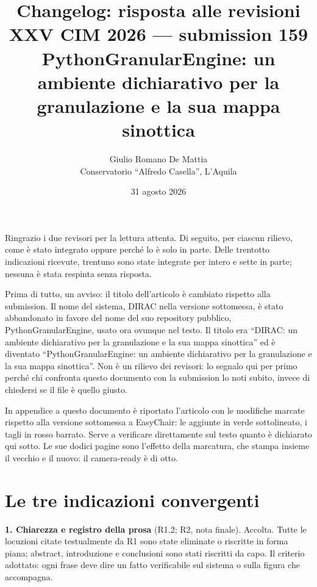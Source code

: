 \documentclass[11pt,a4paper]{article}
\title{\textbf{Changelog: risposta alle revisioni}\\[4pt]
\large XXV CIM 2026 --- submission 159\\
\normalsize PythonGranularEngine: un ambiente dichiarativo per la granulazione
e la sua mappa sinottica}
\author{Giulio Romano De Mattia\\ Conservatorio ``Alfredo Casella'', L'Aquila}
\date{31 agosto 2026}
\begin{document}
\maketitle

Ringrazio i due revisori per la lettura attenta. Di seguito, per ciascun
rilievo, come è stato integrato oppure perché lo è solo in parte. Delle
trentotto indicazioni ricevute, trentuno sono state integrate per intero e
sette in parte; nessuna è stata respinta senza risposta.

Prima di tutto, un avviso: il titolo dell'articolo è cambiato rispetto alla
submission. Il nome del sistema, DIRAC nella versione sottomessa, è stato
abbandonato in favore del nome del suo repository pubblico,
PythonGranularEngine, usato ora ovunque nel testo. Il titolo era
``DIRAC: un ambiente dichiarativo per la granulazione e la sua mappa
sinottica'' ed è diventato ``PythonGranularEngine: un ambiente dichiarativo
per la granulazione e la sua mappa sinottica''. Non è un rilievo dei
revisori: lo segnalo qui per primo perché chi confronta questo documento con
la submission lo noti subito, invece di chiedersi se il file è quello
giusto.

In appendice a questo documento è riportato l'articolo con le modifiche
marcate rispetto alla versione sottomessa a EasyChair: le aggiunte in verde
sottolineato, i tagli in rosso barrato. Serve a verificare direttamente sul
testo quanto è dichiarato qui sotto. Le sue dodici pagine sono l'effetto
della marcatura, che stampa insieme il vecchio e il nuovo: il camera-ready
è di otto.

\section*{Le tre indicazioni convergenti}

\textbf{1. Chiarezza e registro della prosa} (R1.2; R2, nota finale).
Accolta. Tutte le locuzioni citate testualmente da R1 sono state eliminate o
riscritte in forma piana; abstract, introduzione e conclusioni sono stati
riscritti da capo. Il criterio adottato: ogni frase deve dire un fatto
verificabile sul sistema o sulla figura che accompagna.
\end{document}
